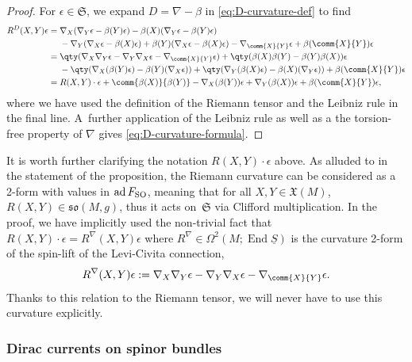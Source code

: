 \documentclass[10pt,a4paper]{amsart}
\numberwithin{equation}{section}
\newcommand{\fso}{\mathfrak{so}}
\newcommand{\fX}{\mathfrak{X}}
\newcommand{\fS}{\mathfrak{S}}
\newcommand{\Sbundle}{\underline{S}}
\newcommand{\1}{\mathbbm{1}}
\DeclareMathOperator{\End}{End}
\DeclareMathOperator{\ad}{ad}
\begin{document}
\begin{proof}
	For $\epsilon\in\fS$, we expand $D=\nabla-\beta$ in \eqref{eq:D-curvature-def} to find
	\begin{align*}
		 R^D(X,Y)\epsilon	
			={}& \nabla_X(\nabla_Y\epsilon-\beta(Y)\epsilon) - \beta(X)(\nabla_Y\epsilon-\beta(Y)\epsilon)	\\
				& - \nabla_Y(\nabla_X\epsilon-\beta(X)\epsilon) + \beta(Y)(\nabla_X\epsilon-\beta(X)\epsilon)
				- \nabla_{\comm{X}{Y}}\epsilon + \beta({\comm{X}{Y}})\epsilon	\\
			={}& \qty(\nabla_X\nabla_Y\epsilon - \nabla_Y\nabla_X\epsilon - \nabla_{\comm{X}{Y}}\epsilon)
				+ \qty(\beta(X)\beta(Y)-\beta(Y)\beta(X))\epsilon	\\
				& - \qty(\nabla_X(\beta(Y)\epsilon)-\beta(Y)(\nabla_X\epsilon)) + \qty(\nabla_Y(\beta(X)\epsilon)
				- \beta(X)(\nabla_Y\epsilon)) + \beta({\comm{X}{Y}})\epsilon \\
			={}& R(X,Y)\cdot\epsilon + \comm{\beta(X)}{\beta(Y)} - \nabla_X(\beta(Y))\epsilon + \nabla_Y(\beta(X))\epsilon + \beta({\comm{X}{Y}})\epsilon,
	\end{align*}
	where we have used the definition of the Riemann tensor and the Leibniz rule in the final line. A~further application of the Leibniz rule as well as a the torsion-free property of $\nabla$ gives \eqref{eq:D-curvature-formula}.
\end{proof}

\begin{Remark}\label{rem:riemann-spinor-action}
	It is worth further clarifying the notation $R(X,Y)\cdot\epsilon$ above. As alluded to in the statement of the proposition, the Riemann curvature can be considered as a 2-form with values in $\ad F_{\rm SO}$, meaning that for all $X,Y\in \fX(M)$, $R(X,Y)\in\fso(M,g)$, thus it acts on~$\fS$ via Clifford multiplication. In the proof, we have implicitly used the non-trivial fact that~${R(X,Y)\cdot\epsilon=R^\nabla(X,Y)\epsilon}$ where $R^\nabla\in\Omega^2(M;\End \Sbundle)$ is the curvature 2-form of the spin-lift of the Levi-Civita connection,
\[
R^\nabla(X,Y)\epsilon:=\nabla_X\nabla_Y\epsilon-\nabla_Y\nabla_X\epsilon-\nabla_{\comm{X}{Y}}\epsilon.
\]
Thanks to this relation to the Riemann tensor, we will never have to use this curvature explicitly.
\end{Remark}

\subsubsection{Dirac currents on spinor bundles}
\label{sec:dirac-current-bundle}
\end{document}
